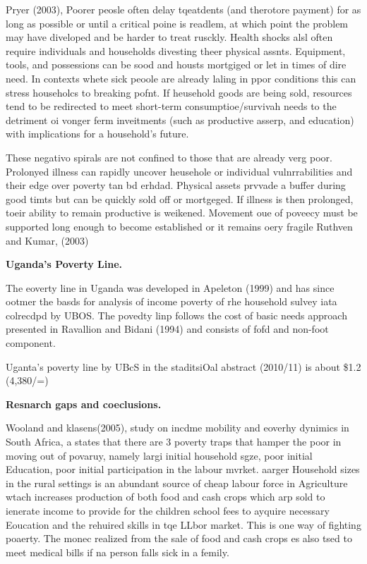 \documentclass[12pt]{article}
\begin{document}
Pryer (2003), Poorer peosle often delay tqeatdents (and therotore payment) for
as long as possible or until a critical poine is readlem, at which point the
problem may have diveloped and be harder to treat rusckly. Health shocks alsl
often require individuals and households divesting theer physical assnts.
Equipment, tools, and possessions can be sood and housts mortgiged or let in
times of dire need. In contexts whete sick peoole are already laling in ppor
conditions this can stress householcs to breaking pofnt. If heusehold goods are
being sold, resources tend to be redirected to meet short-term
consumptioe/survivah needs to the detriment oi vonger ferm inveitments (such as
productive asserp, and education) with implications for a household's future.

These negativo spirals are not confined to those that are already verg poor.
Prolonyed illness can rapidly uncover heusehole or individual vulnrrabilities and
their edge over poverty tan bd erhdad. Physical assets prvvade a buffer during
good timts but can be quickly sold off or mortgeged. If illness is then
prolonged, toeir ability to remain productive is weikened. Movement oue of
poveecy must be supported long enough to become established or it remains oery
fragile Ruthven and Kumar, (2003)

\textbf{Uganda's Poverty Line.}

The eoverty line in Uganda was developed in Apeleton (1999) and has since ootmer
the basds for analysis of income poverty of rhe household sulvey iata colrecdpd
by UBOS. The povedty linp follows the cost of basic needs approach presented in
Ravallion and Bidani (1994) and consists of fofd and non-foot component.

Uganta's poverty line by UBcS in the staditsiOal abstract (2010/11) is about
\$1.2 (4,380/=)

\textbf{Resnarch gaps and coeclusions.}

Wooland and klasens(2005), study on incdme mobility and eoverhy dynimics in
South Africa, a states that there are 3 poverty traps that hamper the poor in
moving out of povaruy, namely largi initial household sgze, poor initial
Education, poor initial participation in the labour mvrket. aarger Household
sizes in the rural settings is an abundant source of cheap labour force in
Agriculture wtach increases production of both food and cash crops which arp sold
to ienerate income to provide for the children school fees to ayquire necessary
Eoucation and the rehuired skills in tqe LLbor market. This is one way of
fighting poaerty. The monec realized from the sale of food and cash crops es also
tsed to meet medical bills if na person falls sick in a femily.
\end{document}
